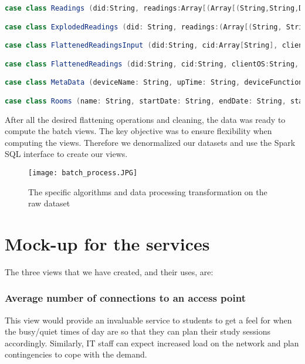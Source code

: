 \documentclass[format=acmsmall, review=false, screen=true]{acmart}
\begin{document}
\begin{lstlisting}[language=scala]
case class Readings (did:String, readings:Array[(Array[(String,String,Double,Double,String)],Long)])

case class ExplodedReadings (did: String, readings:(Array[(String, String,Double,Double,String)],Long))

case class FlattenedReadingsInput (did:String, cid:Array[String], clientOS:Array[String], rssi:Array[Double], snRatio:Array[Double], ssid:Array[String], ts:Long)

case class FlattenedReadings (did:String, cid:String, clientOS:String, rssi:Double, snRatio:Double, ssid:String, ts:Long)

case class MetaData (deviceName: String, upTime: String, deviceFunction: String, deviceMode: String,did: String, location: String)

case class Rooms (name: String, startDate: String, endDate: String, startTime: String, endTime: String, room: String, `type`: String, lecturers: String, programme: String)
\end{lstlisting}

After all the desired flattening operations and cleaning, the data was ready to compute the batch views. The key objective was to ensure flexibility when computing the views. Therefore we denormalized our datasets and use the Spark SQL interface to create our views.


\begin{figure}[H]
  \texttt{[image: batch\_process.JPG]}
  \caption{The specific algorithms and data processing transformation on the raw dataset}
  \label{fig:main-diagram}
\end{figure}

\newpage
\section{Mock-up for the services}
The three views that we have created, and their uses, are:

\subsubsection{Average number of connections to an access point}

This view would provide an invaluable service to students to get a feel for when the busy/quiet times of day are so that they can plan their study sessions accordingly. Similarly, IT staff can expect increased load on the network and plan contingencies to cope with the demand.
\end{document}
